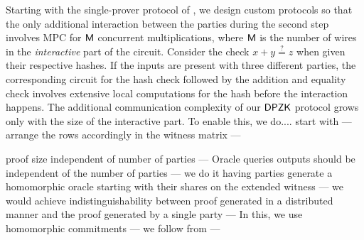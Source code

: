 Starting with the single-prover protocol of \cite{ours}, we design custom protocols so that the only additional interaction between the parties during the second step involves MPC for $\mathsf{M}$ concurrent multiplications, where $\mathsf{M}$ is the number of wires in the \textit{interactive} part of the circuit. Consider the check $x+y \stackrel{?}{=} z$ when given their respective hashes. If the inputs are present with three different parties, the corresponding circuit for the hash check followed by the addition and equality check involves extensive local computations for the hash before the interaction happens.  The additional communication complexity of our $\mathsf{DPZK}$ protocol grows only with the size of the interactive part. To enable this, we do.... start with \cite{ours} --- arrange the rows accordingly in the witness matrix --- 

proof size independent of number of parties --- Oracle queries outputs should be independent of the number of parties --- we do it having parties generate a homomorphic oracle starting with their shares on the extended witness --- we would achieve indistinguishability between proof generated in a distributed manner and the proof generated by a single party ---
In this, we use homomorphic commitments --- we follow from \cite{ours} --- 




%
%
%
